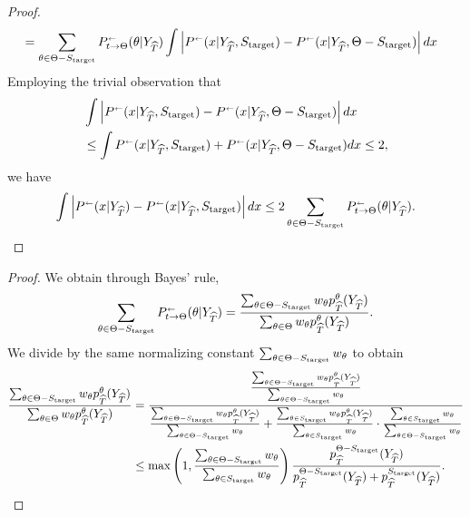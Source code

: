 \begin{proof}
\begin{align*}
&= \sum_{\theta \in \Theta-\Send} \kernelreverse[]_{t \to \Theta}(\theta|Y_{\wh{T}}) \int \left|\kernelreverse[](x|Y_{\wh{T}},\Send)-\kernelreverse[](x|Y_{\wh{T}},\Theta-\Send)\right|dx 
\end{align*}
Employing the trivial observation that 
\begin{align*}
&\int \left|\kernelreverse[](x|Y_{\wh{T}},\Send)-\kernelreverse[](x|Y_{\wh{T}},\Theta-\Send)\right|dx 
\\
&\leq \int \kernelreverse[](x|Y_{\wh{T}},\Send)+\kernelreverse[](x|Y_{\wh{T}},\Theta-\Send)dx  \leq 2,
\end{align*}
we have
\begin{align*}
\int \left|\kernelreverse[](x| Y_{\wh{T}})-\kernelreverse[](x| Y_{\wh{T}},\Send)\right| dx 
 \leq 2 \sum_{\theta \in \Theta-\Send} \kernelreverse[]_{t \to \Theta}(\theta|Y_{\wh{T}}).
\end{align*}
\end{proof}

\masterinequalitytwo*
\begin{proof}
We obtain through Bayes' rule, 
\begin{align*}
 \sum_{\theta \in \Theta-\Send} \kernelreverse[]_{t \to \Theta}(\theta|Y_{\wh{T}})
= \frac{\sum_{\theta \in \Theta-\Send} w_\theta p^\theta_{\wh{T}}(Y_{\wh{T}})}{\sum_{\theta \in \Theta} w_\theta p^\theta_{\wh{T}}(Y_{\wh{T}})}. 
\end{align*}
We divide by the same normalizing constant $\sum_{\theta \in \Theta-S_{\mathrm{target}}} w_\theta$ to obtain
\begin{align*}
 \frac{\sum_{\theta \in \Theta-S_{\mathrm{target}}} w_\theta p^\theta_{\widehat{T}}(Y_{\widehat{T}})}{\sum_{\theta \in \Theta} w_\theta p^\theta_{\widehat{T}}(Y_{\widehat{T}})} &= \frac{\frac{\sum_{\theta \in \Theta-S_{\mathrm{target}}} w_\theta p^\theta_{\widehat{T}}(Y_{\widehat{T}})}{\sum_{\theta \in \Theta-S_{\mathrm{target}}} w_\theta}}{\frac{\sum_{\theta \in \Theta-S_{\mathrm{target}}} w_\theta p^\theta_{\widehat{T}}(Y_{\widehat{T}})}{\sum_{\theta \in \Theta-S_{\mathrm{target}}} w_\theta}+\frac{\sum_{\theta \in S_{\mathrm{target}}} w_\theta p^\theta_{\widehat{T}}(Y_{\widehat{T}})}{\sum_{\theta \in S_{\mathrm{target}}} w_\theta} \cdot \frac{\sum_{\theta \in S_{\mathrm{target}}} w_\theta}{\sum_{\theta \in \Theta-S_{\mathrm{target}}} w_\theta}}\\
&\leq \max\left(1,\frac{\sum_{\theta \in \Theta-S_{\mathrm{target}}} w_\theta}{\sum_{\theta \in S_{\mathrm{target}}} w_\theta}\right)  \frac{p^{\Theta-S_{\mathrm{target}}}_{\widehat{T}}(Y_{\widehat{T}})}{ p^{\Theta-S_{\mathrm{target}}}_{\widehat{T}}(Y_{\widehat{T}})+p^{S_{\mathrm{target}}}_{\widehat{T}}(Y_{\widehat{T}})}. 
\end{align*}

\end{proof}


